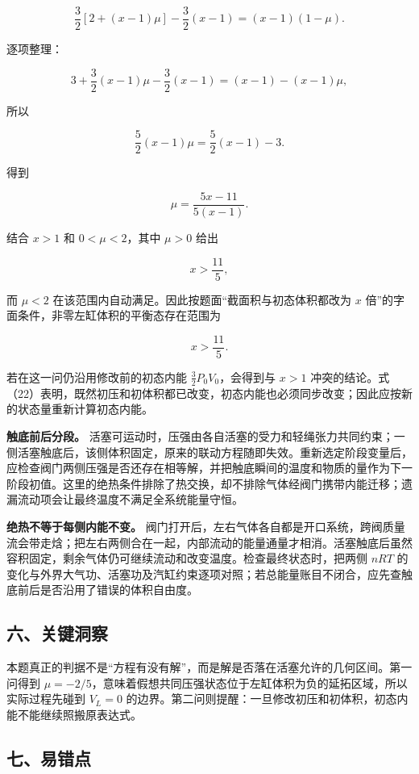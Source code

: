 \documentclass[12pt,a4paper,UTF8]{ctexart}
\begin{document}
\[
\frac32[2+(x-1)\mu]-\frac32(x-1)
=(x-1)(1-\mu).
\]

逐项整理：

\[
3+\frac32(x-1)\mu-\frac32(x-1)
=(x-1)-(x-1)\mu,
\]

所以

\[
\frac52(x-1)\mu=\frac52(x-1)-3.
\]

得到

\[
\boxed{\mu=\frac{5x-11}{5(x-1)}}.
\tag{25}
\]

结合 \(x>1\) 和 \(0<\mu<2\)，其中 \(\mu>0\) 给出

\[
x>\frac{11}{5},
\]

而 \(\mu<2\) 在该范围内自动满足。因此按题面``截面积与初态体积都改为
\(x\) 倍''的字面条件，非零左缸体积的平衡态存在范围为

\[
\boxed{x>\frac{11}{5}}.
\tag{26}
\]

若在这一问仍沿用修改前的初态内能 \(\frac32P_0V_0\)，会得到与 \(x>1\)
冲突的结论。式（22）表明，既然初压和初体积都已改变，初态内能也必须同步改变；因此应按新的状态量重新计算初态内能。

\textbf{触底前后分段。}
活塞可运动时，压强由各自活塞的受力和轻绳张力共同约束；一侧活塞触底后，该侧体积固定，原来的联动方程随即失效。重新选定阶段变量后，应检查阀门两侧压强是否还存在相等解，并把触底瞬间的温度和物质的量作为下一阶段初值。这里的绝热条件排除了热交换，却不排除气体经阀门携带内能迁移；遗漏流动项会让最终温度不满足全系统能量守恒。

\textbf{绝热不等于每侧内能不变。}
阀门打开后，左右气体各自都是开口系统，跨阀质量流会带走焓；把左右两侧合在一起，内部流动的能量通量才相消。活塞触底后虽然容积固定，剩余气体仍可继续流动和改变温度。检查最终状态时，把两侧
\(nRT\)
的变化与外界大气功、活塞功及汽缸约束逐项对照；若总能量账目不闭合，应先查触底前后是否沿用了错误的体积自由度。

\subsection{六、关键洞察}\label{ux516dux5173ux952eux6d1eux5bdf-2}

本题真正的判据不是``方程有没有解''，而是解是否落在活塞允许的几何区间。第一问得到
\(\mu=-2/5\)，意味着假想共同压强状态位于左缸体积为负的延拓区域，所以实际过程先碰到
\(V_L=0\)
的边界。第二问则提醒：一旦修改初压和初体积，初态内能不能继续照搬原表达式。

\subsection{七、易错点}\label{ux4e03ux6613ux9519ux70b9-2}
\end{document}
